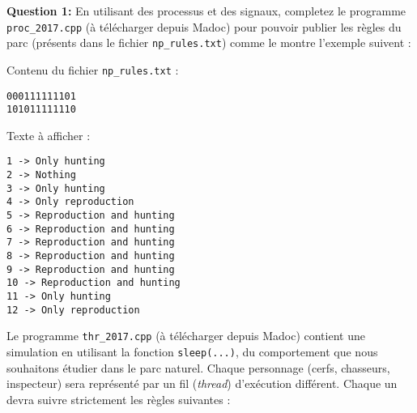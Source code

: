 \documentclass[CC,sansRappel,12pt]{tdtp-utf8}
\newcommand{\tocorrect}[1]{\textcolor{dgreen}{#1}}
\begin{document}
\begin{feuille}
\begin{exercice}
\textbf{Question 1: } \tocorrect{En utilisant des processus et des signaux, completez le programme \texttt{proc\_2017.cpp} (à télécharger depuis {\sc Madoc}) pour pouvoir publier les règles du parc (présents dans le fichier \texttt{np\_rules.txt}) comme le montre l'exemple suivent :}
\vspace{10pt}

Contenu du fichier \texttt{np\_rules.txt} :
\begin{Verbatim}
000111111101 
101011111110 
\end{Verbatim}

Texte à afficher :

\begin{Verbatim}
1 -> Only hunting 
2 -> Nothing
3 -> Only hunting 
4 -> Only reproduction
5 -> Reproduction and hunting 
6 -> Reproduction and hunting 
7 -> Reproduction and hunting 
8 -> Reproduction and hunting 
9 -> Reproduction and hunting 
10 -> Reproduction and hunting 
11 -> Only hunting 
12 -> Only reproduction
\end{Verbatim}

\end{exercice}

\begin{exercice}

\tocorrect{Le programme \texttt{thr\_2017.cpp} (à télécharger depuis {\sc Madoc}) contient une simulation en utilisant la fonction \texttt{sleep(...)}, du comportement que nous souhaitons étudier dans le parc naturel. Chaque personnage (cerfs, chasseurs, inspecteur) sera représenté par un fil (\textit{thread}) d'exécution différent. Chaque un devra suivre strictement les règles suivantes :}


\end{exercice}
\end{feuille}
\end{document}
